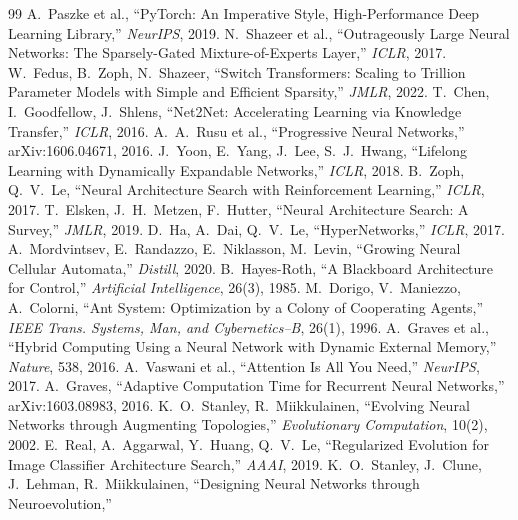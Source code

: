 \documentclass[11pt]{article}
\begin{document}
\begin{thebibliography}{99}
\small
{} A.~Paszke et al.,
``PyTorch: An Imperative Style, High-Performance Deep Learning Library,''
\emph{NeurIPS}, 2019.
 N.~Shazeer et al.,
``Outrageously Large Neural Networks: The Sparsely-Gated Mixture-of-Experts
Layer,'' \emph{ICLR}, 2017.
 W.~Fedus, B.~Zoph, N.~Shazeer,
``Switch Transformers: Scaling to Trillion Parameter Models with Simple and
Efficient Sparsity,'' \emph{JMLR}, 2022.
 T.~Chen, I.~Goodfellow, J.~Shlens,
``Net2Net: Accelerating Learning via Knowledge Transfer,'' \emph{ICLR}, 2016.
 A.~A.~Rusu et al.,
``Progressive Neural Networks,'' arXiv:1606.04671, 2016.
 J.~Yoon, E.~Yang, J.~Lee, S.~J.~Hwang,
``Lifelong Learning with Dynamically Expandable Networks,'' \emph{ICLR}, 2018.
 B.~Zoph, Q.~V.~Le,
``Neural Architecture Search with Reinforcement Learning,'' \emph{ICLR}, 2017.
 T.~Elsken, J.~H.~Metzen, F.~Hutter,
``Neural Architecture Search: A Survey,'' \emph{JMLR}, 2019.
 D.~Ha, A.~Dai, Q.~V.~Le,
``HyperNetworks,'' \emph{ICLR}, 2017.
 A.~Mordvintsev, E.~Randazzo, E.~Niklasson,
M.~Levin, ``Growing Neural Cellular Automata,'' \emph{Distill}, 2020.
 B.~Hayes-Roth,
``A Blackboard Architecture for Control,'' \emph{Artificial Intelligence},
26(3), 1985.
 M.~Dorigo, V.~Maniezzo, A.~Colorni,
``Ant System: Optimization by a Colony of Cooperating Agents,''
\emph{IEEE Trans. Systems, Man, and Cybernetics--B}, 26(1), 1996.
 A.~Graves et al.,
``Hybrid Computing Using a Neural Network with Dynamic External Memory,''
\emph{Nature}, 538, 2016.
 A.~Vaswani et al.,
``Attention Is All You Need,'' \emph{NeurIPS}, 2017.
 A.~Graves,
``Adaptive Computation Time for Recurrent Neural Networks,''
arXiv:1603.08983, 2016.
 K.~O.~Stanley, R.~Miikkulainen,
``Evolving Neural Networks through Augmenting Topologies,''
\emph{Evolutionary Computation}, 10(2), 2002.
 E.~Real, A.~Aggarwal, Y.~Huang, Q.~V.~Le,
``Regularized Evolution for Image Classifier Architecture Search,''
\emph{AAAI}, 2019.
 K.~O.~Stanley, J.~Clune, J.~Lehman,
R.~Miikkulainen, ``Designing Neural Networks through Neuroevolution,''

\end{thebibliography}
\end{document}
